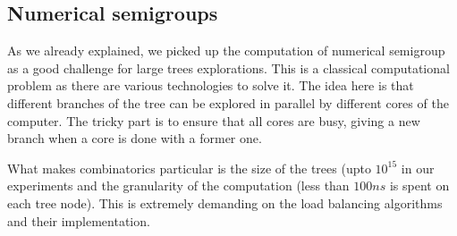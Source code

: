 \documentclass{deliverablereport}
\begin{document}

\subsection{Numerical semigroups}

As we already explained, we picked up the computation of numerical semigroup
as a good challenge for large trees explorations. This is a classical
computational problem as there are various technologies to solve it. The idea
here is that different branches of the tree can be explored in parallel by
different cores of the computer. The tricky part is to ensure that all cores
are busy, giving a new branch when a core is done with a former one.

What makes combinatorics particular is the size of the trees (upto $10^{15}$
in our experiments and the granularity of the computation (less than $100ns$
is spent on each tree node). This is extremely demanding on the load balancing
algorithms and their implementation.
\end{document}
